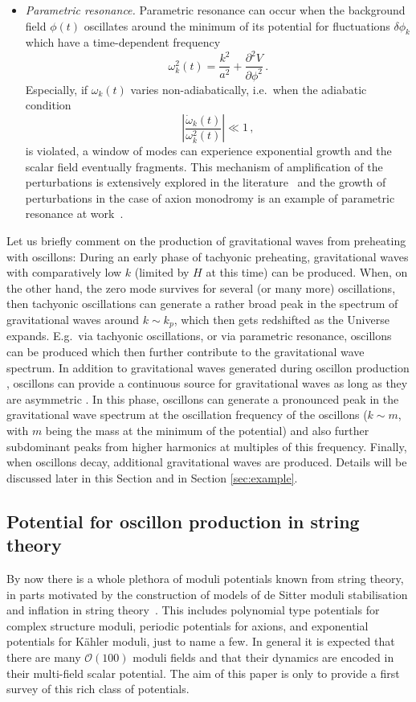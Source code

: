 \documentclass[12pt]{article}
\newcommand{\be}{\begin{equation}}
\newcommand{\ee}{\end{equation}}
\begin{document}
\begin{itemize}
\item \textit{Parametric resonance.} Parametric resonance can occur when the background field $\phi(t)$ oscillates around the minimum of its potential for fluctuations $\delta\phi_k$ which have a time-dependent frequency
\be
\omega^2_k(t)  = \frac{k^2}{a^2} + \frac{\partial^2 V}{\partial\phi^2}\,.
\ee
Especially, if $\omega_k(t)$ varies non-adiabatically, i.e.\ when the adiabatic condition
\be
\left|\frac{\dot{\omega}_k(t)}{\omega^2_k(t)}\right|\ll1\,,
\ee
is violated, a window of modes can experience exponential growth and the scalar field eventually fragments. This mechanism of amplification of the perturbations is extensively explored in the literature~\cite{Kofman:1994rk,Kofman:1997yn} and the growth of perturbations in the case of axion monodromy is an example of parametric resonance at work~\cite{Zhou:2013tsa}.
\end{itemize}
Let us briefly comment on the production of gravitational waves from preheating with oscillons: During an early phase of tachyonic preheating, gravitational waves with comparatively low $k$ (limited by $H$ at this time) can be produced. When, on the other hand, the zero mode survives for several (or many more) oscillations, then tachyonic oscillations can generate a rather broad peak in the spectrum of gravitational waves around $k \sim k_p$, which then gets redshifted as the Universe expands. E.g.\ via tachyonic oscillations, or via parametric resonance, oscillons can be produced which then further contribute to the gravitational wave spectrum. In addition to gravitational waves generated during oscillon production \cite{Zhou:2013tsa}, oscillons can provide a continuous source for gravitational waves as long as they are asymmetric \cite{Antusch:2016con}. In this phase, oscillons can generate a pronounced peak in the gravitational wave spectrum at the oscillation frequency of the oscillons ($k \sim m$, with $m$ being the mass at the minimum of the potential) and also further subdominant peaks from higher harmonics at multiples of this frequency. Finally, when oscillons decay, additional gravitational waves are produced. Details will be discussed later in this Section and in Section \ref{sec:example}.  


\subsection{Potential for oscillon production in string theory}
By now there is a whole plethora of moduli potentials known from string theory, in parts motivated by the construction of models of de Sitter moduli stabilisation and inflation in string theory~\cite{Baumann:2014nda}. This includes polynomial type potentials for complex structure moduli, periodic potentials for axions, and exponential potentials for K\"ahler moduli, just to name a few. In general it is expected that there are many $\mathcal{O}(100)$ moduli fields and that their dynamics are encoded in their multi-field scalar potential. The aim of this paper is only to provide a first survey of this rich class of potentials.
\end{document}
